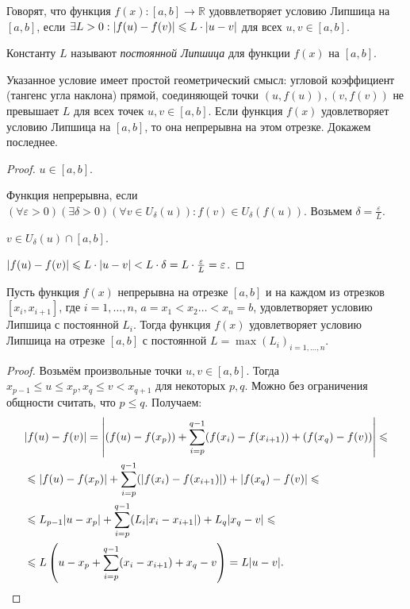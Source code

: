 
\begin{definition}
	Говорят, что функция $f(x): [a, b] \to \mathbb{R}$ удоввлетворяет условию Липшица на $[a, b]$, если $\exists L > 0: \abs{f(u) - f(v)} \leqslant L \cdot \abs{u - v}$ для всех $u, v \in [a, b]$. 
	
	Константу $L$ называют \textit{постоянной Липшица} для функции $f(x)$ на $[a, b]$.
\end{definition}

\begin{utv}
	Указанное условие имеет простой геометрический смысл: угловой коэффициент (тангенс угла наклона) прямой, соединяющей точки $(u, f(u)), (v, f(v))$ не превышает $L$ для всех точек $u, v \in [a, b]$. 
	Если функция $f(x)$ удовлетворяет условию Липшица на $[a, b]$, то она непрерывна на этом отрезке. Докажем последнее. 
\end{utv}
\begin{proof}
	$u \in [a, b]$.
	
	Функция непрерывна, если $(\forall \varepsilon > 0) (\exists \delta > 0) (\forall v \in U_{\delta}(u)): f(v) \in U_{\delta}(f(u))$. Возьмем $\delta = \frac{\varepsilon}{L}$.
	
	$v \in U_{\delta}(u) \cap [a, b]$. 
	
	$\abs{f(u) - f(v)} \leqslant L \cdot \abs{u - v} < L \cdot \delta = L \cdot \frac{\varepsilon}{L} = \varepsilon$. 
\end{proof}

\begin{theorem} \label{LipshForAll}
	Пусть функция $f(x)$ непрерывна на отрезке $[a, b]$ и на каждом из отрезков $[x_i, x_{i + 1}]$, где $i = 1, \dotsc, n$, $a = x_1 < x_2 \dotsc < x_n = b$, удовлетворяет условию Липшица с постоянной $L_i$. Тогда функция $f(x)$ удовлетворяет условию Липшица на отрезке $[a, b]$ с постоянной $L = \max(L_i)_{i = 1, \dotsc, n}$. 
\end{theorem}
\begin{proof}
	Возьмём произвольные точки $u, v \in [a, b]$. Тогда $x_{p - 1} \leqslant u \leqslant x_p, x_q \leqslant v < x_{q + 1}$ для некоторых $p, q$. Можно без ограничения общности считать, что $p \leqslant q$. Получаем:
	\begin{align*}
		&\abs{f(u) - f(v)} = \abs{(f(u) - f(x_p)) + \sum_{i = p}^{q - 1}(f(x_i) - f(x_{i + 1})) + (f(x_q) - f(v))} \leqslant \\
		&\leqslant \abs{f(u) - f(x_p)} + \sum_{i = p}^{q - 1}(\abs{f(x_i) - f(x_{i + 1})}) + \abs{f(x_q) - f(v)} \leqslant \\
		&\leqslant L_{p - 1} \abs{u - x_p} + \sum_{i = p}^{q - 1}(L_i \abs{x_i - x_{i + 1}}) + L_q \abs{x_q - v} \leqslant \\
		&\leqslant L\left(u - x_p + \sum_{i = p}^{q - 1}(x_i - x_{i + 1}) + x_q - v\right) = L\abs{u - v}. 
	\end{align*}
\end{proof}

